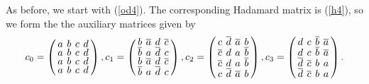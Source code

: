 \documentclass[../../main]{subfiles}
\begin{document}
As before, we start with (\ref{od4}). The corresponding Hadamard matrix is
(\ref{h4}), so we form the the auxiliary matrices given by
\[
  \arraycolsep=2.0pt\def\arraystretch{0.5}
  c_0 = \left(
    \begin{array}{cccc}
      a&b&c&d\\
      a&b&c&d\\
      a&b&c&d\\
      a&b&c&d\\
    \end{array}
  \right),
  c_1 = \left(
    \begin{array}{cccc}
      b&\bar{a}&d&\bar{c}\\
      \bar{b}&a&\bar{d}&c\\
      b&\bar{a}&d&\bar{c}\\
      \bar{b}&a&\bar{d}&c\\
    \end{array}
  \right),
  c_2 = \left(
    \begin{array}{cccc}
      c&\bar{d}&\bar{a}&b\\
      \bar{c}&d&a&\bar{b}\\
      \bar{c}&d&a&\bar{b}\\
      c&\bar{d}&\bar{a}&b\\
    \end{array}
  \right),
  c_3 = \left(
    \begin{array}{cccc}
      d&c&\bar{b}&\bar{a}\\
      d&c&\bar{b}&\bar{a}\\
      \bar{d}&\bar{c}&b&a\\
      \bar{d}&\bar{c}&b&a\\
    \end{array}
  \right).
\]
\end{document}
